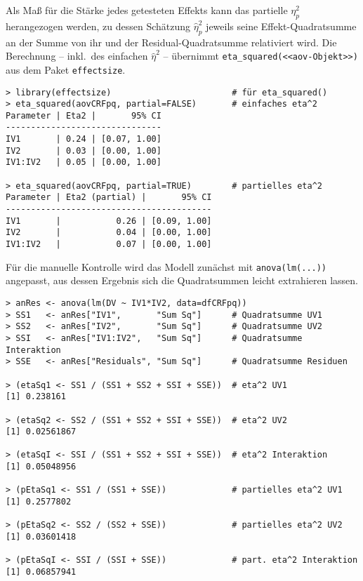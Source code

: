 Als Maß für die Stärke jedes getesteten Effekts kann das partielle $\eta_{p}^{2}$ herangezogen werden, zu dessen Schätzung $\hat{\eta}_{p}^{2}$ jeweils seine Effekt-Quadratsumme an der Summe von ihr und der Residual-Quadratsumme relativiert wird. Die Berechnung -- inkl.\ des einfachen $\hat{\eta}^{2}$ -- übernimmt \lstinline!eta_squared(<<aov-Objekt>>)! aus dem Paket \lstinline!effectsize!.
\begin{lstlisting}
> library(effectsize)                        # für eta_squared()
> eta_squared(aovCRFpq, partial=FALSE)       # einfaches eta^2
Parameter | Eta2 |       95% CI
-------------------------------
IV1       | 0.24 | [0.07, 1.00]
IV2       | 0.03 | [0.00, 1.00]
IV1:IV2   | 0.05 | [0.00, 1.00]

> eta_squared(aovCRFpq, partial=TRUE)        # partielles eta^2
Parameter | Eta2 (partial) |       95% CI
-----------------------------------------
IV1       |           0.26 | [0.09, 1.00]
IV2       |           0.04 | [0.00, 1.00]
IV1:IV2   |           0.07 | [0.00, 1.00]
\end{lstlisting}

Für die manuelle Kontrolle wird das Modell zunächst mit \lstinline!anova(lm(...))! angepasst, aus dessen Ergebnis sich die Quadratsummen leicht extrahieren lassen.
\begin{lstlisting}
> anRes <- anova(lm(DV ~ IV1*IV2, data=dfCRFpq))
> SS1   <- anRes["IV1",       "Sum Sq"]      # Quadratsumme UV1
> SS2   <- anRes["IV2",       "Sum Sq"]      # Quadratsumme UV2
> SSI   <- anRes["IV1:IV2",   "Sum Sq"]      # Quadratsumme Interaktion
> SSE   <- anRes["Residuals", "Sum Sq"]      # Quadratsumme Residuen

> (etaSq1 <- SS1 / (SS1 + SS2 + SSI + SSE))  # eta^2 UV1
[1] 0.238161

> (etaSq2 <- SS2 / (SS1 + SS2 + SSI + SSE))  # eta^2 UV2
[1] 0.02561867

> (etaSqI <- SSI / (SS1 + SS2 + SSI + SSE))  # eta^2 Interaktion
[1] 0.05048956

> (pEtaSq1 <- SS1 / (SS1 + SSE))             # partielles eta^2 UV1
[1] 0.2577802

> (pEtaSq2 <- SS2 / (SS2 + SSE))             # partielles eta^2 UV2
[1] 0.03601418

> (pEtaSqI <- SSI / (SSI + SSE))             # part. eta^2 Interaktion
[1] 0.06857941
\end{lstlisting}

